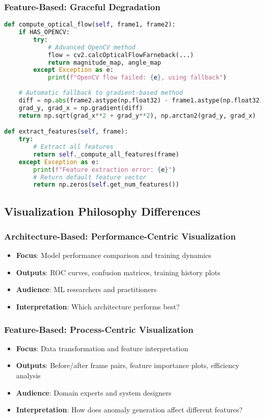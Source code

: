 \documentclass[11pt,a4paper]{article}
\begin{document}
\subsubsection{Feature-Based: Graceful Degradation}
\begin{lstlisting}[language=Python, caption=Feature-Based Error Handling]
def compute_optical_flow(self, frame1, frame2):
    if HAS_OPENCV:
        try:
            # Advanced OpenCV method
            flow = cv2.calcOpticalFlowFarneback(...)
            return magnitude_map, angle_map
        except Exception as e:
            print(f"OpenCV flow failed: {e}, using fallback")
    
    # Automatic fallback to gradient-based method
    diff = np.abs(frame2.astype(np.float32) - frame1.astype(np.float32))
    grad_y, grad_x = np.gradient(diff)
    return np.sqrt(grad_x**2 + grad_y**2), np.arctan2(grad_y, grad_x)

def extract_features(self, frame):
    try:
        # Extract all features
        return self._compute_all_features(frame)
    except Exception as e:
        print(f"Feature extraction error: {e}")
        # Return default feature vector
        return np.zeros(self.get_num_features())
\end{lstlisting}

\subsection{Visualization Philosophy Differences}

\subsubsection{Architecture-Based: Performance-Centric Visualization}
\begin{itemize}
    \item \textbf{Focus}: Model performance comparison and training dynamics
    \item \textbf{Outputs}: ROC curves, confusion matrices, training history plots
    \item \textbf{Audience}: ML researchers and practitioners
    \item \textbf{Interpretation}: Which architecture performs best?
\end{itemize}

\subsubsection{Feature-Based: Process-Centric Visualization}
\begin{itemize}
    \item \textbf{Focus}: Data transformation and feature interpretation
    \item \textbf{Outputs}: Before/after frame pairs, feature importance plots, efficiency analysis
    \item \textbf{Audience}: Domain experts and system designers
    \item \textbf{Interpretation}: How does anomaly generation affect different features?
\end{itemize}
\end{document}
